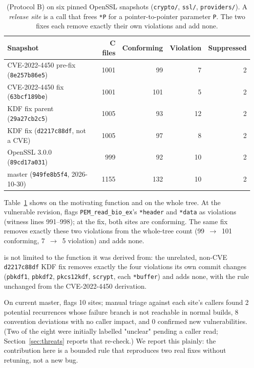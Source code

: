 \begin{table}[t]
  \centering
  \caption{\tool (Protocol B) on six pinned OpenSSL snapshots
    (\texttt{crypto/}, \texttt{ssl/}, \texttt{providers/}). A
    \emph{release site} is a call that frees \texttt{*P} for a
    pointer-to-pointer parameter \texttt{P}. The two fixes each remove
    exactly their own violations and add none.}
  \label{tab:rq1-wholetree}
  \begin{tabular}{lrrrr}
    \toprule
    Snapshot & C files & Conforming & Violation & Suppressed \\
    \midrule
    CVE-2022-4450 pre-fix (\texttt{8e257b86e5})  & 1001 & 99  & 7  & 2 \\
    CVE-2022-4450 fix (\texttt{63bcf189be})      & 1001 & 101 & 5  & 2 \\
    KDF fix parent (\texttt{29a27cb2c5})         & 1005 & 93  & 12 & 2 \\
    KDF fix (\texttt{d2217c88df}, not a CVE)     & 1005 & 97  & 8  & 2 \\
    OpenSSL 3.0.0 (\texttt{89cd17a031})          & 999  & 92  & 10 & 2 \\
    master (\texttt{949fe8b5f4}, 2026-10-30)     & 1155 & 132 & 10 & 2 \\
    \bottomrule
  \end{tabular}
\end{table}

Table~\ref{tab:rq1-wholetree} shows \tool on the motivating function and on
the whole tree. At the vulnerable revision, \tool flags
\texttt{PEM\_read\_bio\_ex}'s \texttt{*header} and \texttt{*data} as
violations (witness lines 991--998); at the fix, both sites are
conforming. The same fix removes exactly these two violations from the
whole-tree count (99~$\to$~101 conforming, 7~$\to$~5 violation) and adds
none.

\begin{observation}
\label{obs:rq1-conformance}
\tool is not limited to the function it was derived from: the unrelated,
non-CVE \texttt{d2217c88df} KDF fix removes exactly the four violations
its own commit changes (\texttt{pbkdf1}, \texttt{pbkdf2}, \texttt{pkcs12kdf},
\texttt{scrypt}, each \texttt{*buffer}) and adds none, with the rule
unchanged from the CVE-2022-4450 derivation.
\end{observation}

\begin{observation}
\label{obs:rq1-mastertriage}
On current master, \tool flags 10 sites; manual triage against each site's
callers found 2 potential recurrences whose failure branch is not
reachable in normal builds, 8 convention deviations with no caller impact,
and 0 confirmed new vulnerabilities. (Two of the eight were initially
labelled "unclear" pending a caller read; Section~\ref{sec:threats}
reports that re-check.) We report this plainly: the contribution here is
a bounded rule that reproduces two real fixes without retuning, not a new
bug.
\end{observation}

